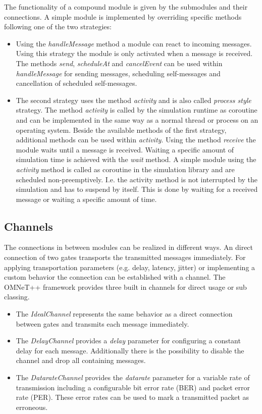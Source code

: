 The functionality of a compound module is given by the submodules and their connections.
A simple module is implemented by overriding specific methods following one of the two strategies:

\begin{itemize}
    \item Using the \emph{handleMessage} method a module can react to incoming messages.
    Using this strategy the module is only activated when a message is received.
    The methods \emph{send}, \emph{scheduleAt} and \emph{cancelEvent} can be used within \emph{handleMessage} for sending messages, scheduling self-messages and cancellation of scheduled self-messages. \cite[section 4.4.1]{omnet_manual}
    
    \item The second strategy uses the method \emph{activity} and is also called \emph{process style} strategy.
    The method \emph{activity} is called by the simulation runtime as coroutine and can be implemented in the same way as a normal thread or process on an operating system.
    Beside the available methods of the first strategy, additional methods can be used within \emph{activity}.
    Using the method \emph{receive} the module waits until a message is received.
    Waiting a specific amount of simulation time is achieved with the \emph{wait} method.
    A simple module using the \emph{activity} method is called as coroutine in the simulation library and are scheduled non-preemptively.
    I.e. the activity method is not interrupted by the simulation and has to suspend by itself.
    This is done by waiting for a received message or waiting a specific amount of time. \cite[section 4.4.2]{omnet_manual}
\end{itemize}

\subsection{Channels}
\label{sec:omnet_components_channels}
The connections in between modules can be realized in different ways.
An direct connection of two gates transports the transmitted messages immediately.
For applying transportation parameters (e.g. delay, latency, jitter) or implementing a custom behavior the connection can be established with a channel.
The OMNeT++ framework provides three built in channels for direct usage or sub classing.

\begin{itemize}
    \item The \emph{IdealChannel} represents the same behavior as a direct connection between gates and transmits each message immediately.
    \item The \emph{DelayChannel} provides a \emph{delay} parameter for configuring a constant delay for each message.
    Additionally there is the possibility to disable the channel and drop all containing messages.
    \item The \emph{DatarateChannel} provides the \emph{datarate} parameter for a variable rate of transmission including a configurable bit error rate (BER) and packet error rate (PER).
    These error rates can be used to mark a transmitted packet as erroneous.
\end{itemize}

